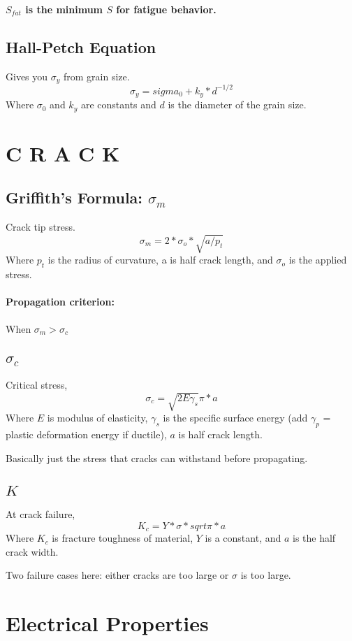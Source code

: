\documentclass[a4paper,12pt]{report}
\begin{document}
\textbf{$S_{fat}$ is the minimum $S$ for fatigue behavior.}


\subsection{Hall-Petch Equation}
Gives you $\sigma_y$ from grain size.
$$\sigma_y = sigma_0 + k_y * d^{-1/2}$$
Where $\sigma_0$ and $k_y$ are constants and $d$ is the diameter of the grain size.





\section{C R A C K}
\subsection{Griffith's Formula: $\sigma_m$}
Crack tip stress. $$\sigma_m = 2*\sigma_o*\sqrt{a/p_t}$$
Where $p_t$ is the radius of curvature, a is half crack length, and $\sigma_o$ is the applied stress.

\paragraph{Propagation criterion: } When $\sigma_m > \sigma_c$

\subsection{$\sigma_c$}
Critical stress, $$\sigma_c = \sqrt{2E\gamma_s}{\pi*a}$$ Where $E$ is modulus of elasticity, $\gamma_s$ is the specific surface energy (add $\gamma_p$ = plastic deformation energy if ductile), $a$ is half crack length.

Basically just the stress that cracks can withstand before propagating. 

\subsection{$K$}
At crack failure, $$K_c = Y*\sigma*sqrt{\pi*a}$$ Where $K_c$ is fracture toughness of material, $Y$ is a constant, and $a$ is the half crack width.

Two failure cases here: either cracks are too large or $\sigma$ is too large.

\section{Electrical Properties}
\end{document}
